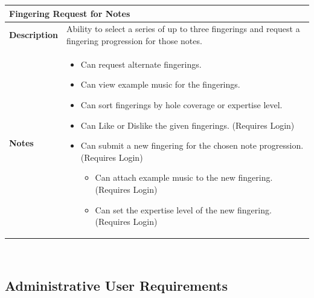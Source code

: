\documentclass[12pt,english]{article}
\providecommand{\tabularnewline}{\\}
\providecommand{\tabularnewline}{\\}
\begin{document}
\begin{tabular}{|p{3cm}|p{13cm}|}
\hline 
\multicolumn{2}{|l|}{\textbf{Fingering Request for Notes}}\tabularnewline
\hline 
\textbf{Description}  & Ability to select a series of up to three fingerings and request a
fingering progression for those notes. \tabularnewline
\hline 
\textbf{Notes}  & \begin{itemize}
\item Can request alternate fingerings. 
\item Can view example music for the fingerings. 
\item Can sort fingerings by hole coverage or expertise level. 
\item Can \textquotedbl{}Like\textquotedbl{} or \textquotedbl{}Dislike\textquotedbl{}
the given fingerings. (Requires Login) 
\item Can submit a new fingering for the chosen note progression. (Requires
Login) 

\begin{itemize}
\item Can attach example music to the new fingering. (Requires Login) 
\item Can set the expertise level of the new fingering. (Requires Login) \end{itemize}
\end{itemize}
\tabularnewline
\hline 
\end{tabular}\\[0.5cm]


\subsection{Administrative User Requirements}
\end{document}
